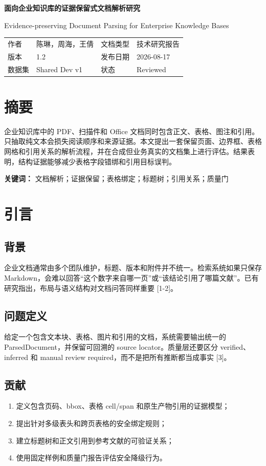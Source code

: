 \documentclass[10.5pt,a4paper]{article}
\begin{document}
{\fontsize{21}{25}\selectfont\bfseries 面向企业知识库的证据保留式文档解析研究}\par
{\color{gray}\fontsize{12}{15}\selectfont Evidence-preserving Document Parsing for Enterprise Knowledge Bases}\par\vspace{3mm}{\color{blue}\rule{\textwidth}{1.8pt}}\par\vspace{5mm}
\begin{tabular}{p{31mm}p{55mm}p{31mm}p{55mm}}
作者 & 陈琳，周海，王倩 & 文档类型 & 技术研究报告\\
版本 & 1.2 & 发布日期 & 2026-08-17\\
数据集 & Shared Dev v1 & 状态 & Reviewed\\
\end{tabular}
\section*{摘要}
企业知识库中的 PDF、扫描件和 Office 文档同时包含正文、表格、图注和引用。只抽取纯文本会损失阅读顺序和来源证据。本文提出一套保留页面、边界框、表格网格和引用关系的解析流程，并在合成但业务真实的文档集上进行评估。结果表明，结构证据能够减少表格字段错绑和引用目标误判。

\textbf{关键词：} 文档解析；证据保留；表格绑定；标题树；引用关系；质量门
\newpage
\section{引言}
\subsection{背景}
企业文档通常由多个团队维护，标题、版本和附件并不统一。检索系统如果只保存 Markdown，会难以回答“这个数字来自哪一页”或“该结论引用了哪篇文献”。已有研究指出，布局与语义结构对文档问答同样重要 [1-2]。
\subsection{问题定义}
给定一个包含文本块、表格、图片和引用的文档，系统需要输出统一的 ParsedDocument，并保留可回溯的 source locator。质量层还要区分 verified、inferred 和 manual review required，而不是把所有推断都当成事实 [3]。
\subsection{贡献}
\begin{enumerate}
\item 定义包含页码、bbox、表格 cell/span 和原生产物引用的证据模型；
\item 提出针对多级表头和跨页表格的安全绑定规则；
\item 建立标题树和正文引用到参考文献的可验证关系；
\item 使用固定样例和质量门报告评估安全降级行为。
\end{enumerate}
\end{document}
